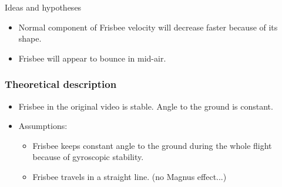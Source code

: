 \documentclass{beamer}
\begin{document}
\begin{frame}

\begin{block}{Ideas and hypotheses}
\begin{itemize}
\item Normal component of Frisbee velocity will decrease faster because of its shape.

\item Frisbee will appear to bounce in mid-air.
\end{itemize}
\end{block}

\end{frame}


\begin{frame}

\frametitle{Theoretical description}

\begin{block}{}
\begin{itemize}
\item Frisbee in the original video is stable. Angle to the ground is constant.

\item Assumptions:

\begin{itemize}
\item Frisbee keeps constant angle to the ground during the whole flight because of gyroscopic stability.

\item Frisbee travels in a straight line. (no Magnus effect...)
\end{itemize}
\end{itemize}
\end{block}

\end{frame}

\end{document}

